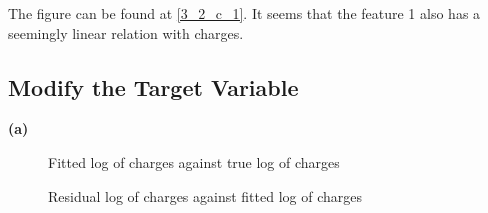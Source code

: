 \documentclass{article}
\begin{document}
The figure can be found at \ref{3_2_c_1}. It seems that the feature 1 also has a seemingly linear relation with charges.\bigbreak

\subsection{Modify the Target Variable}

\noindent \textbf{(a)} \bigbreak

\begin{figure}[!htbp]
\centering
{}
\caption{Fitted log of charges against true log of charges} \label{3_3_a_1}
\end{figure}

\begin{figure}[!htbp]
\centering
{}
\caption{Residual log of charges against fitted log of charges} \label{3_3_a_2}
\end{figure}
\end{document}
